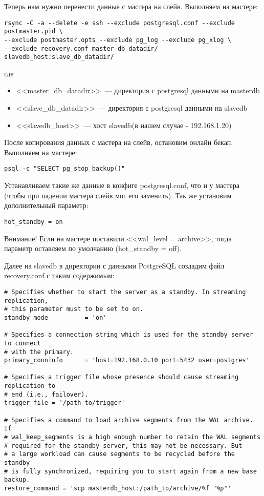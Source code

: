Теперь нам нужно перенести данные с мастера на слейв. Выполняем на мастере:
\begin{lstlisting}[label=lst:streaming11,caption=Выполняем на мастере]
rsync -C -a --delete -e ssh --exclude postgresql.conf --exclude postmaster.pid \
--exclude postmaster.opts --exclude pg_log --exclude pg_xlog \
--exclude recovery.conf master_db_datadir/ slavedb_host:slave_db_datadir/ 
\end{lstlisting}
где
\begin{itemize}
\item <<master\_db\_datadir>>~--- директория с postgresql данными на masterdb
\item <<slave\_db\_datadir>>~--- директория с postgresql данными на slavedb
\item <<slavedb\_host>>~--- хост slavedb(в нашем случае - 192.168.1.20)
\end{itemize}

После копирования данных с мастера на слейв, остановим онлайн бекап. Выполняем на мастере:
\begin{lstlisting}[label=lst:streaming12,caption=Выполняем на мастере]
psql -c "SELECT pg_stop_backup()"
\end{lstlisting}

Устанавливаем такие же данные в конфиге postgresql.conf, что и у мастера (чтобы при падении мастера слейв мог его заменить). 
Так же установим дополнительный параметр:
\begin{lstlisting}[label=lst:streaming13,caption=Конфиг слейва]
hot_standby = on
\end{lstlisting}
Внимание! Если на мастере поставили <<wal\_level = archive>>, тогда параметр оставляем по умолчанию (hot\_standby = off).

Далее на slavedb в директории с данными PostgreSQL создадим файл recovery.conf с таким содержимым:
\begin{lstlisting}[label=lst:streaming14,caption=Конфиг recovery.conf]
# Specifies whether to start the server as a standby. In streaming replication,
# this parameter must to be set to on.
standby_mode          = 'on'

# Specifies a connection string which is used for the standby server to connect
# with the primary.
primary_conninfo      = 'host=192.168.0.10 port=5432 user=postgres'

# Specifies a trigger file whose presence should cause streaming replication to
# end (i.e., failover).
trigger_file = '/path_to/trigger'

# Specifies a command to load archive segments from the WAL archive. If
# wal_keep_segments is a high enough number to retain the WAL segments
# required for the standby server, this may not be necessary. But
# a large workload can cause segments to be recycled before the standby
# is fully synchronized, requiring you to start again from a new base backup.
restore_command = 'scp masterdb_host:/path_to/archive/%f "%p"'
\end{lstlisting}

